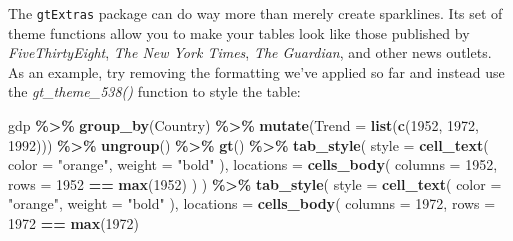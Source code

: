 \documentclass[
]{book}
\newenvironment{Shaded}{\begin{snugshade}}{\end{snugshade}}
\newcommand{\AttributeTok}[1]{\textcolor[rgb]{0.13,0.29,0.53}{#1}}
\newcommand{\FunctionTok}[1]{\textcolor[rgb]{0.13,0.29,0.53}{\textbf{#1}}}
\newcommand{\NormalTok}[1]{#1}
\newcommand{\SpecialCharTok}[1]{\textcolor[rgb]{0.81,0.36,0.00}{\textbf{#1}}}
\newcommand{\StringTok}[1]{\textcolor[rgb]{0.31,0.60,0.02}{#1}}
\begin{document}
The \texttt{gtExtras} package can do way more than merely create sparklines. Its set of theme functions allow you to make your tables look like those published by \emph{FiveThirtyEight}, \emph{The New York Times}, \emph{The Guardian}, and other news outlets. As an example, try removing the formatting we've applied so far and instead use the \emph{gt\_theme\_538()} function to style the table:

\begin{Shaded}
\begin{Highlighting}[]
\NormalTok{gdp }\SpecialCharTok{\%\textgreater{}\%}
  \FunctionTok{group\_by}\NormalTok{(Country) }\SpecialCharTok{\%\textgreater{}\%}
  \FunctionTok{mutate}\NormalTok{(}\AttributeTok{Trend =} \FunctionTok{list}\NormalTok{(}\FunctionTok{c}\NormalTok{(}\StringTok{\textasciigrave{}}\AttributeTok{1952}\StringTok{\textasciigrave{}}\NormalTok{, }\StringTok{\textasciigrave{}}\AttributeTok{1972}\StringTok{\textasciigrave{}}\NormalTok{, }\StringTok{\textasciigrave{}}\AttributeTok{1992}\StringTok{\textasciigrave{}}\NormalTok{))) }\SpecialCharTok{\%\textgreater{}\%}
  \FunctionTok{ungroup}\NormalTok{() }\SpecialCharTok{\%\textgreater{}\%}
  \FunctionTok{gt}\NormalTok{() }\SpecialCharTok{\%\textgreater{}\%}
  \FunctionTok{tab\_style}\NormalTok{(}
    \AttributeTok{style =} \FunctionTok{cell\_text}\NormalTok{(}
      \AttributeTok{color =} \StringTok{"orange"}\NormalTok{,}
      \AttributeTok{weight =} \StringTok{"bold"}
\NormalTok{    ),}
    \AttributeTok{locations =} \FunctionTok{cells\_body}\NormalTok{(}
      \AttributeTok{columns =} \StringTok{\textasciigrave{}}\AttributeTok{1952}\StringTok{\textasciigrave{}}\NormalTok{,}
      \AttributeTok{rows =} \StringTok{\textasciigrave{}}\AttributeTok{1952}\StringTok{\textasciigrave{}} \SpecialCharTok{==} \FunctionTok{max}\NormalTok{(}\StringTok{\textasciigrave{}}\AttributeTok{1952}\StringTok{\textasciigrave{}}\NormalTok{)}
\NormalTok{    )}
\NormalTok{  ) }\SpecialCharTok{\%\textgreater{}\%}
  \FunctionTok{tab\_style}\NormalTok{(}
    \AttributeTok{style =} \FunctionTok{cell\_text}\NormalTok{(}
      \AttributeTok{color =} \StringTok{"orange"}\NormalTok{,}
      \AttributeTok{weight =} \StringTok{"bold"}
\NormalTok{    ),}
    \AttributeTok{locations =} \FunctionTok{cells\_body}\NormalTok{(}
      \AttributeTok{columns =} \StringTok{\textasciigrave{}}\AttributeTok{1972}\StringTok{\textasciigrave{}}\NormalTok{,}
      \AttributeTok{rows =} \StringTok{\textasciigrave{}}\AttributeTok{1972}\StringTok{\textasciigrave{}} \SpecialCharTok{==} \FunctionTok{max}\NormalTok{(}\StringTok{\textasciigrave{}}\AttributeTok{1972}\StringTok{\textasciigrave{}}\NormalTok{)}

\end{Highlighting}
\end{Shaded}
\end{document}
